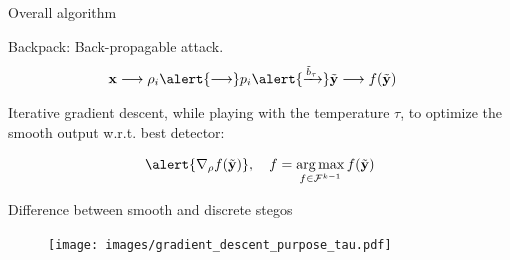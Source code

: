 \documentclass[10pt]{beamer}
\DeclareMathOperator*{\argmax}{arg\,max}
\begin{document}
\begin{frame}{Overall algorithm}


\alert{Backpack}: \alert{Back-p}ropagable att\alert{ack}.
   \begin{align*}
    \mathbf{x} \longrightarrow \rho_i \alert{\longrightarrow} p_i \alert{ \xrightarrow{\tilde{b}_\tau}} \tilde{\mathbf{y}} & \longrightarrow f(\tilde{\mathbf{y}}) %
    \end{align*}
\pause

Iterative gradient descent, while playing with the temperature $\tau$, to optimize the smooth output w.r.t. best detector:

\begin{equation}
    \alert{\nabla_{\rho} f(\tilde{\mathbf{y}})}, \quad  f = \argmax_{f \in \mathcal{F}^{k-1}} f(\tilde{\mathbf{y}})
\end{equation}

\end{frame}

\begin{frame}{Difference between smooth and discrete stegos}
    \begin{figure}[h]
        \texttt{[image: images/gradient\_descent\_purpose\_tau.pdf]}
    \end{figure}
\end{frame}


\end{document}
